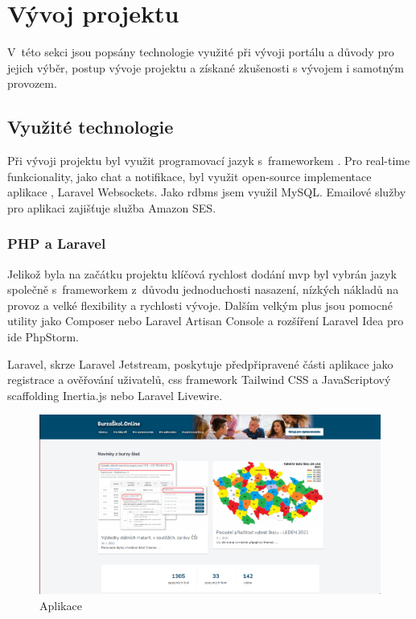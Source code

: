 \section{Vývoj projektu}

V~této sekci jsou popsány technologie využité při vývoji portálu \bso{} a důvody pro jejich výběr, postup vývoje projektu a získané zkušenosti s vývojem i samotným provozem.

\subsection{Využité technologie}
\label{sub:used-technologies}

Při vývoji projektu byl využit programovací jazyk  s~\gls{framework}em  . Pro \gls{real-time} funkcionality, jako chat a notifikace, byl využit \gls{open-source} implementace aplikace , Laravel Websockets\cite{laravel-websockets}. Jako \acrshort{rdbms} jsem využil MySQL\cite{mysql}. Emailové služby pro aplikaci zajišťuje služba Amazon SES\cite{amazon-ses}.

\subsubsection{PHP a Laravel}

Jelikož byla na začátku projektu \bso{} klíčová rychlost dodání \gls{mvp} byl vybrán jazyk  společně s~\gls{framework}em  z~důvodu jednoduchosti nasazení, nízkých nákladů na provoz a velké flexibility a rychlosti vývoje. Dalším velkým plus jsou pomocné utility jako Composer\cite{composer} nebo Laravel Artisan Console\cite{laravel-artisan} a rozšíření Laravel Idea\cite{laravel-idea} pro \acrshort{ide} PhpStorm\cite{phpstorm}.

Laravel, skrze Laravel Jetstream\cite{laravel-jetstream}, poskytuje předpřipravené části aplikace jako registrace a ověřování uživatelů, \acrshort{css} \gls{framework} Tailwind CSS\cite{tailwind-css} a JavaScriptový \gls{scaffolding} Inertia.js\cite{inertia-js} nebo Laravel Livewire\cite{laravel-livewire}.

\begin{figure}[h]
\centering
\includegraphics[width=\textwidth]{img/burzaskol-online.png}
\caption{Aplikace \bso{}}
\label{fig:burzaskol-online-2020}
\end{figure}

